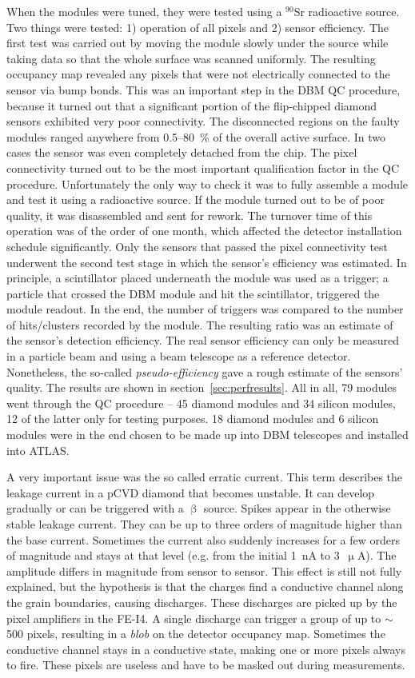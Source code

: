 \documentclass[12pt]{packages/mytustyle}  %
\begin{document}
When the modules were tuned, they were tested using a $^{90}$Sr radioactive source. Two things were tested: 1) operation of all pixels and 2) sensor efficiency. The first test was carried out by moving the module slowly under the source while taking data so that the whole surface was scanned uniformly. The resulting occupancy map revealed any pixels that were not electrically connected to the sensor via bump bonds. This was an important step in the DBM QC procedure, because it turned out that a significant portion of the flip-chipped diamond sensors exhibited very poor connectivity. The disconnected regions on the faulty modules ranged anywhere from 0.5--80~\% of the overall active surface. In two cases the sensor was even completely detached from the chip. The pixel connectivity turned out to be the most important qualification factor in the QC procedure. Unfortunately the only way to check it was to fully assemble a module and test it using a radioactive source. If the module turned out to be of poor quality, it was disassembled and sent for rework. The turnover time of this operation was of the order of one month, which affected the detector installation schedule significantly. Only the sensors that passed the pixel connectivity test underwent the second test stage in which the sensor's efficiency was estimated. In principle, a scintillator placed underneath the module was used as a trigger; a particle that crossed the DBM module and hit the scintillator, triggered the module readout. In the end, the number of triggers was compared to the number of hits/clusters recorded by the module. The resulting ratio was an estimate of the sensor's detection efficiency. The real sensor efficiency can only be measured in a particle beam and using a beam telescope as a reference detector. Nonetheless, the so-called \emph{pseudo-efficiency} gave a rough estimate of the sensors' quality. The results are shown in section~\ref{sec:perfresults}.  All in all, 79 modules went through the QC procedure -- 45 diamond modules and 34 silicon modules, 12 of the latter only for testing purposes. 18 diamond modules and 6 silicon modules were in the end chosen to be made up into DBM telescopes and installed into ATLAS.

A very important issue was the so called erratic current. This term describes the leakage current in a pCVD diamond that becomes unstable. It can develop gradually or can be triggered with a $\upbeta$ source. Spikes appear in the otherwise stable leakage current. They can be up to three orders of magnitude higher than the base current. Sometimes the current also suddenly increases for a few orders of magnitude and stays at that level (e.g. from the initial 1~nA to 3~$\upmu$A). The amplitude differs in magnitude from sensor to sensor. This effect is still not fully explained, but the hypothesis is that the charges find a conductive channel along the grain boundaries, causing discharges. These discharges are picked up by the pixel amplifiers in the FE-I4. A single discharge can trigger a group of up to $\sim$500 pixels, resulting in a \emph{blob} on the detector occupancy map. Sometimes the conductive channel stays in a conductive state, making one or more pixels always to fire. These pixels are useless and have to be masked out during measurements. 
\end{document}
